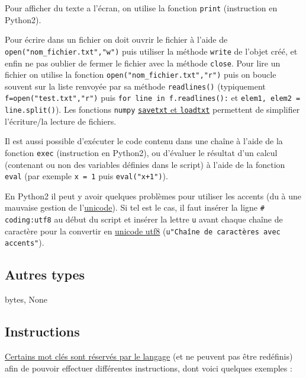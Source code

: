 \documentclass{article}
\begin{document}
Pour afficher du texte a l'écran, on utilise la fonction \texttt{print} (instruction en Python2).

Pour écrire dans un fichier on doit ouvrir le fichier à l'aide de \texttt{open("nom\_fichier.txt","w")} puis utiliser la méthode \texttt{write} de l'objet créé, et enfin ne pas oublier de fermer le fichier avec la méthode \texttt{close}. Pour lire un fichier on utilise la fonction \texttt{open("nom\_fichier.txt","r")} puis on boucle souvent sur la liste renvoyée par sa méthode \texttt{readlines()} (typiquement \texttt{f=open("test.txt","r")} puis \texttt{for line in f.readlines():} et \texttt{elem1, elem2 = line.split()}). Les fonctions \texttt{numpy} \href{}{\texttt{savetxt} et \texttt{loadtxt}} permettent de simplifier l'écriture/la lecture de fichiers.

Il est aussi possible d'exécuter le code contenu dans une chaîne à l'aide de la fonction \texttt{exec} (instruction en Python2), ou d'évaluer le résultat d'un calcul (contenant ou non des variables définies dans le script) à l'aide de la fonction \texttt{eval} (par exemple \texttt{x = 1} puis \texttt{eval("x+1")}).

En Python2 il peut y avoir quelques problèmes pour utiliser les accents (du à une mauvaise gestion de l'\href{https://fr.wikipedia.org/wiki/Unicode}{unicode}). Si tel est le cas, il faut insérer la ligne \texttt{\# coding:utf8} au début du script et insérer la lettre \texttt{u} avant chaque chaîne de caractère pour la convertir en \href{https://fr.wikipedia.org/wiki/UTF-8}{unicode utf8} (\texttt{u"Chaîne de caractères avec accents"}).
\subsection*{Autres types}
bytes, None

\subsection*{Instructions}
\href{https://fr.wikibooks.org/wiki/Programmation_Python/Tableau_des_mots_r\%C3\%A9serv\%C3\%A9s}{Certains mot clés sont réservés par le langage} (et ne peuvent pas être redéfinis) afin de pouvoir effectuer différentes instructions, dont voici quelques exemples :
\end{document}
